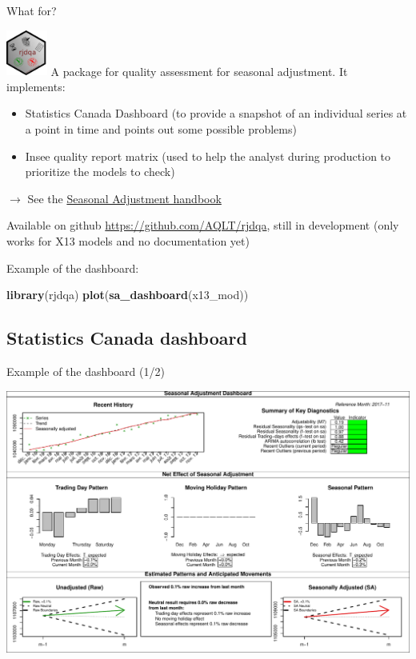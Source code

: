 \documentclass[10pt,xcolor=table,color={dvipsnames,usenames},ignorenonframetext,usepdftitle=false,french]{beamer}
\newenvironment{Shaded}{\begin{snugshade}}{\end{snugshade}}
\newcommand{\KeywordTok}[1]{\textcolor[rgb]{0.13,0.29,0.53}{\textbf{#1}}}
\newcommand{\NormalTok}[1]{#1}
\begin{document}
\begin{frame}[fragile]{What for?}

\includegraphics[height = 1.5cm]{img/rjdqa_logo.png} A package for
quality assessment for seasonal adjustment. It implements:

\begin{itemize}
\item
  Statistics Canada Dashboard (to provide a snapshot of an individual
  series at a point in time and points out some possible problems)
\item
  Insee quality report matrix (used to help the analyst during
  production to prioritize the models to check)
\end{itemize}

\(\rightarrow\) See the
\href{https://ec.europa.eu/eurostat/web/products-manuals-and-guidelines/-/KS-GQ-18-001?inheritRedirect=true}{Seasonal
Adjustment handbook}

Available on github \url{https://github.com/AQLT/rjdqa}, still in
development (only works for X13 models and no documentation yet)

Example of the dashboard:

\begin{Shaded}
\begin{Highlighting}[]
\KeywordTok{library}\NormalTok{(rjdqa)}
\KeywordTok{plot}\NormalTok{(}\KeywordTok{sa_dashboard}\NormalTok{(x13_mod))}
\end{Highlighting}
\end{Shaded}

\end{frame}

\subsection{Statistics Canada
dashboard}\label{statistics-canada-dashboard}

\begin{frame}{Example of the dashboard (1/2)}

\footnotesize
\includegraphics{rjdemetra_files/figure-beamer/unnamed-chunk-17-1.pdf}

\end{frame}
\end{document}
